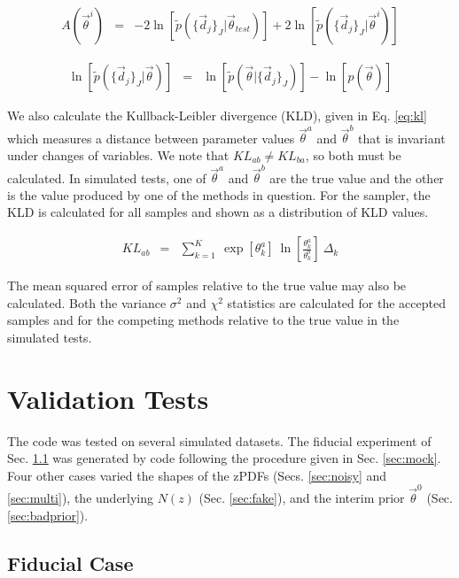 \documentclass[preprint]{aastex}
\begin{document}
\begin{eqnarray}
\label{eq:llr}
A(\vec{\theta}^{i}) &=& 
-2\ln[\tilde{p}(\{\vec{d}_{j}\}_{J}|\vec{\theta}_{test})]+2\ln[\tilde{p}(\{\vec{
d}_{j}\}_{J}|\vec{\theta}^{i})]
\end{eqnarray}

\begin{eqnarray}
\label{eq:llr-how}
\ln[\tilde{p}(\{\vec{d}_{j}\}_{J}|\vec{\theta})] &=& 
\ln[\tilde{p}(\vec{\theta}|\{\vec{d}_{j}\}_{J})]-\ln[p(\vec{\theta})]
\end{eqnarray}

We also calculate the Kullback-Leibler divergence (KLD), given in Eq. 
\ref{eq:kl} which measures a distance between parameter values 
$\vec{\theta}^{a}$ and $\vec{\theta}^{b}$ that is invariant under changes of 
variables.  We note that $KL_{ab}\neq KL_{ba}$, so both must be calculated.  In 
simulated tests, one of $\vec{\theta}^{a}$ and $\vec{\theta}^{b}$ are the true 
value and the other is the value produced by one of the methods in question.  
For the sampler, the KLD is calculated for all samples and shown as a 
distribution of KLD values.

\begin{eqnarray}
\label{eq:kl}
KL_{ab} &=& \sum_{k=1}^{K}\ \exp[\theta_{k}^{a}]\ 
\ln\left[\frac{\theta_{k}^{a}}{\theta_{k}^{b}}\right]\ \Delta_{k}
\end{eqnarray}

The mean squared error of samples relative to the true value may also be 
calculated.  Both the variance $\sigma^{2}$ and $\chi^{2}$ statistics are 
calculated for the accepted samples and for the competing methods relative to 
the true value in the simulated tests.

\clearpage
\section{Validation Tests}
\label{sec:valid}

The code was tested on several simulated datasets.  The fiducial experiment of 
Sec. \ref{sec:null} was generated by code following the procedure given in Sec. 
\ref{sec:mock}.  Four other cases varied the shapes of the zPDFs (Secs. 
\ref{sec:noisy} and \ref{sec:multi}), the underlying $N(z)$ (Sec. 
\ref{sec:fake}), and the interim prior $\vec{\theta}^{0}$ (Sec. 
\ref{sec:badprior}).  

\clearpage
\subsection{Fiducial Case}
\label{sec:null}
\end{document}
